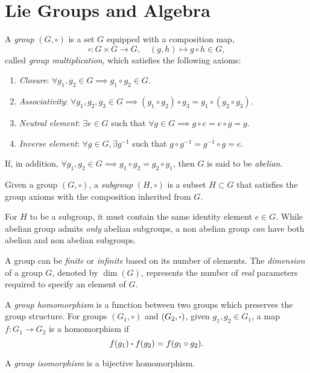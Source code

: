 \section{Lie Groups and Algebra}\label{sec:lie-groups-algebras}
\begin{definition}[Group]\label{def:group-axioms}
    A \emph{group} $(G,\circ)$ is a set $G$ equipped with a composition map,
    \begin{equation}
        \circ \colon G \times G \to G, \quad (g,h) \mapsto g \circ h \in G ,
    \end{equation}
    called \emph{group multiplication}, which satisfies the following axioms:
    \begin{enumerate}
        \item \emph{Closure}: $\forall g_1, g_2 \in G \implies g_1 \circ g_2 \in G$.
        \item \emph{Associativity}: $\forall g_1, g_2, g_3 \in G \implies (g_1 \circ g_2) \circ g_3 = g_1 \circ (g_2 \circ g_3)$.
        \item \emph{Neutral element}: $\exists e \in G$ such that $\forall g \in G \implies g \circ e = e \circ g = g$.
        \item \emph{Inverse element}: $\forall g \in G, \exists g^{-1}$ such that $g \circ g^{-1} = g^{-1} \circ g = e$.
    \end{enumerate}
    If, in addition, $\forall g_1, g_2 \in G \implies g_1 \circ g_2 = g_2 \circ g_1$, then $G$ is said to be \emph{abelian}.
\end{definition}

\begin{definition}[Subgroup]
    Given a group $(G, \circ)$, a \emph{subgroup} $(H,\circ)$ is a subset $H \subset G$ that satisfies the group axioms with the composition inherited from $G$.
\end{definition}

\begin{remark}
    For $H$ to be a subgroup, it must contain the same identity element $e \in G$. While abelian group admits \emph{only} abelian subgroups, a non abelian group \emph{can} have both abelian and non abelian subgroups.
\end{remark}

A group can be \emph{finite} or \emph{infinite} based on its number of elements. The \emph{dimension} of a group $G$, denoted by $\dim(G)$, represents the number of \emph{real} parameters required to specify an element of $G$.

\begin{definition}\label{def:group-homomorphism}
    A \emph{group homomorphism} is a function between two groups which preserves the group structure. For groups $(G_1, \circ)$ and $(G_2, \boldsymbol{\cdot})$, given $g_1, g_2 \in G_1$, a map $f\colon G_1 \to G_2$ is a homomorphism if
    \begin{equation}
        f(g_1) \boldsymbol{\cdot} f(g_2) = f(g_1 \circ g_2).
    \end{equation}

    A \emph{group isomorphism} is a bijective homomorphism.
\end{definition}


